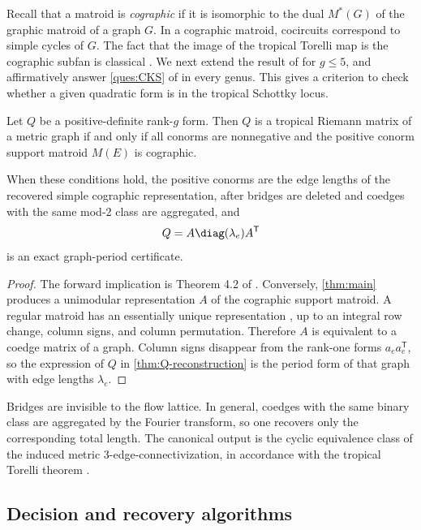 \documentclass[11pt,letterpaper]{amsart}
\begin{document}
Recall that a matroid is \emph{cographic} if it is isomorphic to the dual $M^*(G)$ of the graphic matroid of a graph $G$. In a cographic matroid, cocircuits correspond to simple cycles of $G$. The fact that the image of the tropical Torelli map is the cographic subfan is classical \cite[Theorem~5.2.4]{brannetti2011torelli}. We next extend the result of \cite{sikiric2022iso} for $g \leq 5$, and affirmatively answer \cref{ques:CKS} of \cite{chua2019schottky} in every genus. This gives a criterion to check whether a given quadratic form is in the tropical Schottky locus.

\begin{corollary}\label{cor:schottky}
Let $Q$ be a positive-definite rank-$g$ form.  Then $Q$ is a tropical Riemann matrix of a metric graph if and only if all conorms are nonnegative and the positive conorm support matroid $M(E)$ is cographic.

When these conditions hold, the positive conorms are the edge lengths of the recovered simple cographic representation, after bridges are deleted and coedges with the same mod-2 class are aggregated, and
\[
  Q=A\diag(\lambda_e)A^{\mathsf T}
\]
is an exact graph-period certificate.
\end{corollary}

\begin{proof}
The forward implication is Theorem 4.2 of \cite{chua2019schottky}.  Conversely, \cref{thm:main} produces a unimodular representation $A$ of the cographic support matroid.  A regular matroid has an essentially unique representation \cite[Corollary~10.1.4]{oxley}, up to an integral row change, column signs, and column permutation.  Therefore $A$ is equivalent to a coedge matrix of a graph.  Column signs disappear from the rank-one forms $a_ea_e^{\mathsf T}$, so the expression of $Q$ in \cref{thm:Q-reconstruction} is the period form of that graph with edge lengths $\lambda_e$.
\end{proof}

\begin{remark}
    Bridges are invisible to the flow lattice.  In general, coedges with the same binary class are aggregated by the Fourier transform, so one recovers only the corresponding total length. The canonical output is the cyclic equivalence class of the induced metric $3$-edge-connectivization, in accordance with the tropical Torelli theorem \cite{caporaso2010torelli,brannetti2011torelli}.
\end{remark}


\subsection{Decision and recovery algorithms}
\end{document}
